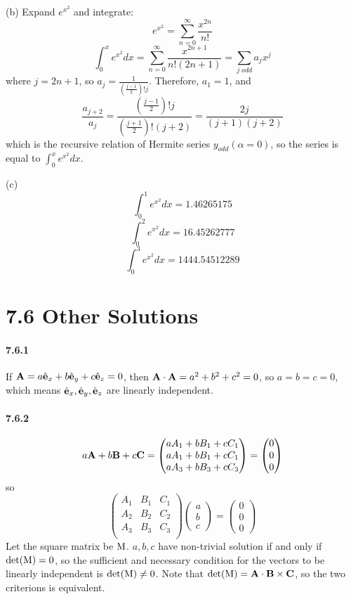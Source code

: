 \documentclass[a4paper]{article}
\begin{document}
(b)
Expand $e^{x^2}$ and integrate:
\[
e^{x^2}=\sum_{n=0}^\infty \frac{x^{2n}}{n!}
\]
\[
\int_0^x e^{x^2}dx=\sum_{n=0}^\infty\frac{x^{2n+1}}{n!(2n+1)}=\sum_{j\;odd}a_jx^j
\]
where $j=2n+1$, so $a_j=\frac{1}{(\frac{j-1}{2})!j}$. Therefore, $a_1=1$, and
\[
\frac{a_{j+2}}{a_j}=\frac{(\frac{j-1}{2})!j}{(\frac{j+1}{2})!(j+2)}=\frac{2j}{(j+1)(j+2)}
\]
which is the recursive relation of Hermite series $y_{odd}(\alpha=0)$, so the series is equal to $\int_0^x e^{x^2}dx$.
\medskip

(c) 
\[
\int_0^1 e^{x^2}dx=1.46265175
\]
\[
\int_0^2 e^{x^2}dx=16.45262777
\]
\[
\int_0^3 e^{x^2}dx=1444.54512289
\]

\section*{7.6 Other Solutions}

\paragraph{7.6.1}
If $\mathbf{A}=a\hat{\mathbf{e}}_x+b\hat{\mathbf{e}}_y+c\hat{\mathbf{e}}_z=0$, then $\mathbf{A}\cdot\mathbf{A}=a^2+b^2+c^2=0$, so $a=b=c=0$, which means $\hat{\mathbf{e}}_x,\hat{\mathbf{e}}_y,\hat{\mathbf{e}}_z$ are linearly independent.

\paragraph{7.6.2}
\[
a\mathbf{A}+b\mathbf{B}+c\mathbf{C}=
\begin{pmatrix}
aA_1+bB_1+cC_1\\
aA_1+bB_1+cC_1\\
aA_3+bB_3+cC_3
\end{pmatrix}=
\begin{pmatrix}
0\\0\\0
\end{pmatrix}
\]
so
\[
\begin{pmatrix}
A_1&B_1&C_1\\
A_2&B_2&C_2\\
A_3&B_3&C_3\\
\end{pmatrix}
\begin{pmatrix}
a\\b\\c
\end{pmatrix}=
\begin{pmatrix}
0\\0\\0
\end{pmatrix}
\]
Let the square matrix be $\mathrm{M}$.\; $a,b,c$ have non-trivial solution if and only if $\det(\mathrm{M})=0$, so the sufficient and necessary condition for the vectors to be linearly independent is $\det(\mathrm{M})\neq0$. Note that $\det(\mathrm{M})=\mathbf{A}\cdot\mathbf{B}\times\mathbf{C}$, so the two criterions is equivalent.
\end{document}
